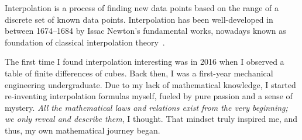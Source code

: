 Interpolation is a process of finding new data points based on the range of a discrete set of known data points.
Interpolation has been well-developed in between 1674--1684
by Issac Newton's fundamental works, nowadays known as foundation of classical interpolation
theory~\cite{meijering2002chronology}.

The first time I found interpolation interesting was in 2016 when I observed a table of finite differences of cubes.
Back then, I was a first-year mechanical engineering undergraduate.
Due to my lack of mathematical knowledge, I started re-inventing interpolation
formulas myself, fueled by pure passion and a sense of mystery.
\textit{All the mathematical laws and relations exist from the very beginning; we only reveal and describe them},
I thought.
That mindset truly inspired me, and thus, my own mathematical journey began.

